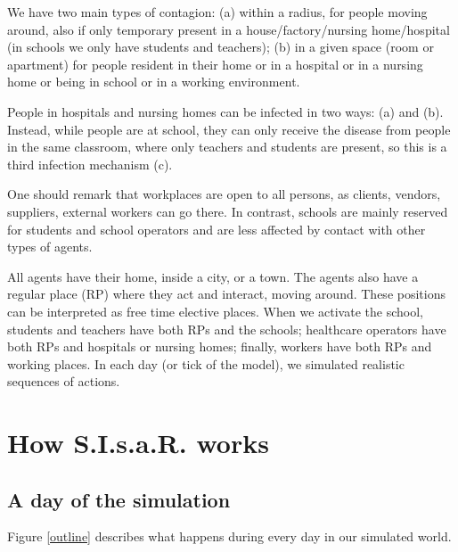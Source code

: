 \documentclass[graybox]{svmult}
\begin{document}
We have two main types of contagion: (a) within a radius, for people moving around, also if only temporary present in a house/factory/nursing home/hospital (in schools we only have students and teachers); (b) in a given space (room or apartment) for people resident in their home or in a hospital or in a nursing home or being in school or in a working environment.

People in hospitals and nursing homes can be infected in two ways: (a) and (b). Instead, while people are at school, they can only receive the disease from people in the same classroom, where only teachers and students are present, so this is a third infection mechanism (c).

One should remark that workplaces are open to all persons, as clients, vendors, suppliers, external workers can go there. In contrast, schools are mainly reserved for students and school operators and are less affected by contact with other types of agents.

All agents have their home, inside a city, or a town. The agents also have a regular place (RP) where they act and interact, moving around. These positions can be interpreted as free time elective places. When we activate the school, students and teachers have both RPs and the schools; healthcare operators have both RPs and hospitals or nursing homes; finally, workers have both RPs and working places. In each day (or tick of the model), we simulated realistic sequences of actions.




\section{How S.I.s.a.R. works}
\label{howWorks}

\subsection{A day of the simulation}\label{aDay}

Figure \ref{outline} describes what happens during every day in our simulated world.
\end{document}
